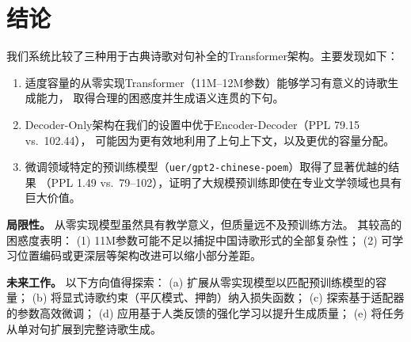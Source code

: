 \documentclass[11pt,a4paper]{article}
\begin{document}
\section{结论}
\label{sec:conclusion}

我们系统比较了三种用于古典诗歌对句补全的Transformer架构。主要发现如下：

\begin{enumerate}[nosep]
    \item 适度容量的从零实现Transformer（11M--12M参数）能够学习有意义的诗歌生成能力，
          取得合理的困惑度并生成语义连贯的下句。
    \item Decoder-Only架构在我们的设置中优于Encoder-Decoder（PPL 79.15 vs.~102.44），
          可能因为更有效地利用了上句上下文，以及更优的容量分配。
    \item 微调领域特定的预训练模型（\texttt{uer/gpt2-chinese-poem}）取得了显著优越的结果
          （PPL 1.49 vs.~79--102），证明了大规模预训练即使在专业文学领域也具有巨大价值。
\end{enumerate}

\textbf{局限性。}
从零实现模型虽然具有教学意义，但质量远不及预训练方法。
其较高的困惑度表明：
(1) 11M参数可能不足以捕捉中国诗歌形式的全部复杂性；
(2) 可学习位置编码或更深层等架构改进可以缩小部分差距。

\textbf{未来工作。}
以下方向值得探索：
(a) 扩展从零实现模型以匹配预训练模型的容量；
(b) 将显式诗歌约束（平仄模式、押韵）纳入损失函数；
(c) 探索基于适配器的参数高效微调；
(d) 应用基于人类反馈的强化学习以提升生成质量；
(e) 将任务从单对句扩展到完整诗歌生成。
\end{document}
